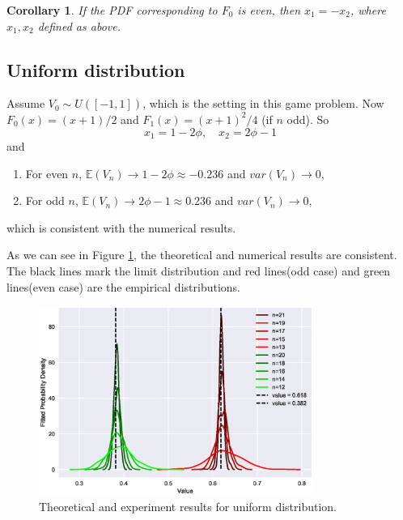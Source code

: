 \documentclass[a4paper,english]{article}
\newtheorem{col}{Corollary}[section]
\begin{document}
\begin{spacing}{1.4}
\begin{col}
  If the PDF corresponding to $F_0$ is even, then $x_1 = -x_2$, where $x_1, x_2$ defined as above.
\end{col}

\subsection{Uniform distribution}
Assume $V_0 \sim U([-1, 1])$, which is the setting in this game problem. Now $F_0(x) = (x+1)/2$ and $F_1(x) = (x+1)^2/4$ (if $n$ odd). So
\begin{equation}
  x_1 = 1 - 2\phi, \quad x_2 = 2\phi - 1
\end{equation}
and
\begin{enumerate}
  \item For even $n$, $\mathbb{E} (V_n) \to 1 - 2\phi \approx -0.236$ and $var(V_n) \to 0$,
  \item For odd $n$, $\mathbb{E} (V_n) \to 2\phi - 1 \approx 0.236$ and $var(V_n) \to 0$,
\end{enumerate}
which is consistent with the numerical results.

As we can see in Figure \ref{Comparison}, the theoretical and numerical results are consistent. The black lines mark the limit distribution and red lines(odd case) and green lines(even case) are the empirical distributions.
\begin{figure}[!htb]
\centering
\includegraphics[width=0.8\textwidth]{figures/plot5.eps}
\caption{Theoretical and experiment results for uniform distribution.}
\label{Comparison}
\end{figure}


\end{spacing}
\end{document}
